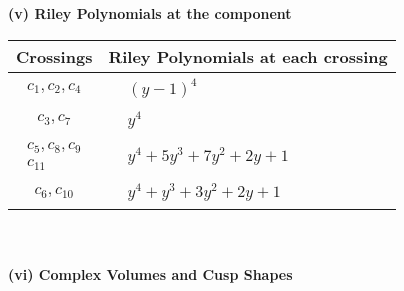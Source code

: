 \documentclass[1p]{elsarticle_modified}
\theoremstyle{definition}
\begin{document}
\newpage\renewcommand{\arraystretch}{1}
\flushleft \textbf{(v) Riley Polynomials at the component}\newline \\
\begin{tabular}{m{50pt}|m{274pt}}
Crossings & \hspace{64pt}Riley Polynomials at each crossing \\
\hline $$\begin{aligned}c_{1},c_{2},c_{4}\end{aligned}$$&$\begin{aligned}
&(y-1)^4
\end{aligned}$\\
\hline $$\begin{aligned}c_{3},c_{7}\end{aligned}$$&$\begin{aligned}
&y^4
\end{aligned}$\\
\hline $$\begin{aligned}c_{5},c_{8},c_{9}\\c_{11}\end{aligned}$$&$\begin{aligned}
&y^4+5 y^3+7 y^2+2 y+1
\end{aligned}$\\
\hline $$\begin{aligned}c_{6},c_{10}\end{aligned}$$&$\begin{aligned}
&y^4+y^3+3 y^2+2 y+1
\end{aligned}$\\
\hline
\end{tabular}\\~\\
\newpage\flushleft \textbf{(vi) Complex Volumes and Cusp Shapes}
\end{document}
